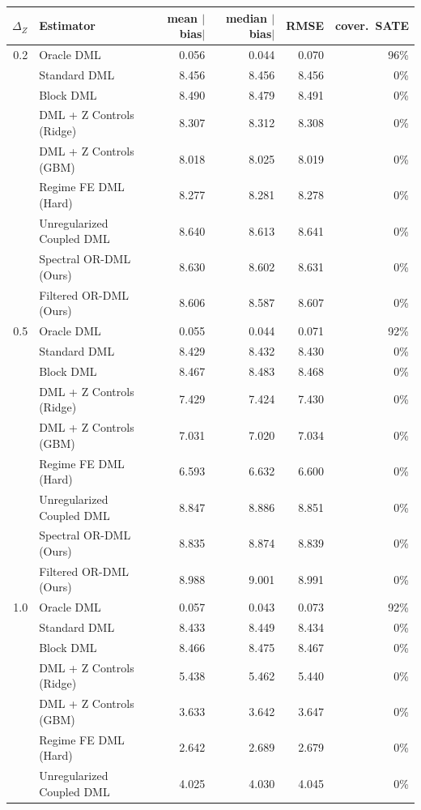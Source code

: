 \begin{tabular}{rlrrrr}
\toprule
$\Delta_Z$ & Estimator & mean $|$bias$|$ & median $|$bias$|$ & RMSE & cover.\ SATE \\
\midrule
0.2 & Oracle DML & 0.056 & 0.044 & 0.070 & 96\% \\
 & Standard DML & 8.456 & 8.456 & 8.456 & 0\% \\
 & Block DML & 8.490 & 8.479 & 8.491 & 0\% \\
 & DML + Z Controls (Ridge) & 8.307 & 8.312 & 8.308 & 0\% \\
 & DML + Z Controls (GBM) & 8.018 & 8.025 & 8.019 & 0\% \\
 & Regime FE DML (Hard) & 8.277 & 8.281 & 8.278 & 0\% \\
 & Unregularized Coupled DML & 8.640 & 8.613 & 8.641 & 0\% \\
 & Spectral OR-DML (Ours) & 8.630 & 8.602 & 8.631 & 0\% \\
 & Filtered OR-DML (Ours) & 8.606 & 8.587 & 8.607 & 0\% \\
\midrule
0.5 & Oracle DML & 0.055 & 0.044 & 0.071 & 92\% \\
 & Standard DML & 8.429 & 8.432 & 8.430 & 0\% \\
 & Block DML & 8.467 & 8.483 & 8.468 & 0\% \\
 & DML + Z Controls (Ridge) & 7.429 & 7.424 & 7.430 & 0\% \\
 & DML + Z Controls (GBM) & 7.031 & 7.020 & 7.034 & 0\% \\
 & Regime FE DML (Hard) & 6.593 & 6.632 & 6.600 & 0\% \\
 & Unregularized Coupled DML & 8.847 & 8.886 & 8.851 & 0\% \\
 & Spectral OR-DML (Ours) & 8.835 & 8.874 & 8.839 & 0\% \\
 & Filtered OR-DML (Ours) & 8.988 & 9.001 & 8.991 & 0\% \\
\midrule
1.0 & Oracle DML & 0.057 & 0.043 & 0.073 & 92\% \\
 & Standard DML & 8.433 & 8.449 & 8.434 & 0\% \\
 & Block DML & 8.466 & 8.475 & 8.467 & 0\% \\
 & DML + Z Controls (Ridge) & 5.438 & 5.462 & 5.440 & 0\% \\
 & DML + Z Controls (GBM) & 3.633 & 3.642 & 3.647 & 0\% \\
 & Regime FE DML (Hard) & 2.642 & 2.689 & 2.679 & 0\% \\
 & Unregularized Coupled DML & 4.025 & 4.030 & 4.045 & 0\% \\

\end{tabular}
